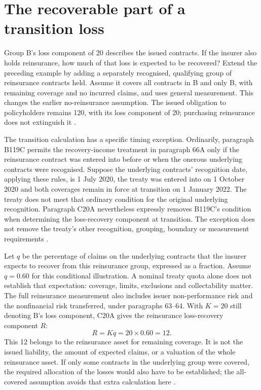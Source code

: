 \section{The recoverable part of a transition loss}
\label{sec:reinsurance-transition-recovery}

Group B's loss component of 20 describes the issued contracts. If the insurer
also holds reinsurance, how much of that loss is expected to be recovered?
Extend the preceding example by adding a separately recognised, qualifying
group of reinsurance contracts held. Assume it covers all contracts in B and
only B, with remaining coverage and no incurred claims, and uses general
measurement. This changes the earlier no-reinsurance assumption. The issued
obligation to policyholders remains 120, with its loss component of 20;
purchasing reinsurance does not extinguish it
\citep[paragraphs 60--64 and 75]{aasb17}.

The transition calculation has a specific timing exception. Ordinarily,
paragraph B119C permits the recovery-income treatment in paragraph 66A only
if the reinsurance contract was entered into before or when the onerous
underlying contracts were recognised. Suppose the underlying contracts'
recognition date, applying these rules, is 1 July 2020, the treaty was entered
into on 1 October 2020 and
both coverages remain in force at transition on 1 January 2022. The treaty
does not meet that ordinary condition for the original underlying recognition.
Paragraph C20A nevertheless expressly removes B119C's condition when
determining the loss-recovery component at transition. The exception does
not remove the treaty's other recognition, grouping, boundary or measurement
requirements \citep[paragraphs 61--66B, B119C and C20A]{aasb17}.

Let $q$ be the percentage of claims on the underlying contracts that the
insurer expects to recover from this reinsurance group, expressed as a
fraction. Assume $q=0.60$ for this conditional illustration. A nominal treaty
quota alone does not establish that expectation: coverage, limits, exclusions
and collectability matter. The full reinsurance measurement also includes
issuer non-performance risk and the nonfinancial risk transferred, under
paragraphs 63--64. With $K=20$ still denoting B's loss component, C20A gives
the reinsurance loss-recovery component $R$:
\[
 R=Kq=20\times 0.60=12.
\]
This 12 belongs to the reinsurance asset for remaining coverage. It is not
the issued liability, the amount of expected claims, or a valuation of the
whole reinsurance asset. If only some contracts in the underlying group were
covered, the required allocation of the losses would also have to be
established; the all-covered assumption avoids that extra calculation here
\citep[paragraphs 63--64, 66B, B119E and C20A]{aasb17}.

